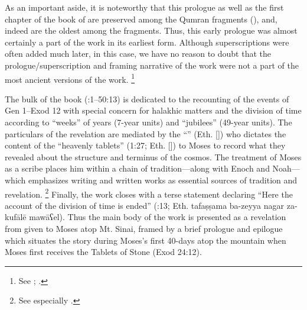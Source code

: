 %
\noindent
As an important aside, it is noteworthy that this prologue as well as the first chapter of the book of \jub are preserved among the Qumran fragments (), and, indeed are the oldest among the \jub fragments. Thus, this early prologue was almost certainly a part of the work in its earliest form. Although superscriptions were often added much later, in this case, we have no reason to doubt that the prologue/superscription and framing narrative of the work were not a part of the most ancient versions of the work.%
    \footnote{See 
        \cite[1:125]{vanderkam2018};
        \cite[25]{vanderkam_metso-etal2010}.}

The bulk of the book (:1--50:13) is dedicated to the recounting of the events of Gen 1--Exod 12 with special concern for halakhic matters and the division of time according to ``weeks'' of years (7-year units) and ``jubilees'' (49-year units). The particulars of the revelation are mediated by the ``\ap'' (Eth.  []) who dictates the content of the ``heavenly tablets'' (1:27; Eth.  []) to Moses to record what they revealed about the structure and terminus of the cosmos.\autocite{martinez_najman-tigchelaar2012} The treatment of Moses as a scribe places him within a chain of tradition---along with Enoch and Noah---which emphasizes writing and written works as essential sources of tradition and revelation.%
        \footnote{See especially
                \cite[381--388]{najman_jsj1999}.} 
Finally, the work closes with a terse statement declaring ``Here the account of the division of time is ended'' (:13; Eth. 
        {tafaṣṣama ba-zeyya nagar za-kufālē mawāʕel}).
Thus the main body of the work is presented as a revelation from \yahweh given to Moses atop Mt. Sinai, framed by a brief prologue and epilogue which situates the story during Moses's first 40-days atop the mountain when Moses first receives the Tablets of Stone (Exod 24:12).\autocite[1:129]{vanderkam2018}


